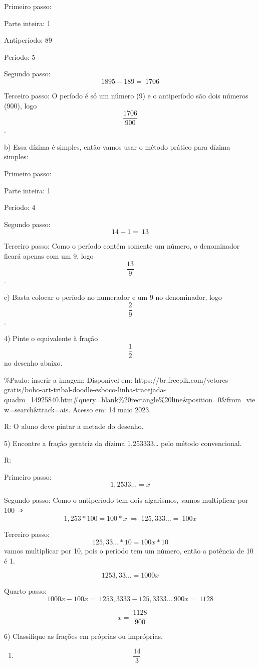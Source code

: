 Primeiro passo:

Parte inteira: 1

Antiperíodo: 89

Período: 5

Segundo passo: \[1895 - 189 = \ 1706\]

Terceiro passo: O período é só um número (9) e o antiperíodo são dois
números (900), logo \[\frac{1706}{900}\].

b) Essa dízima é simples, então vamos usar o método prático para dízima
simples:

Primeiro passo:

Parte inteira: 1

Período: 4

Segundo passo: \[14 - 1 = \ 13\]

Terceiro passo: Como o período contém somente um número, o denominador
ficará apenas com um 9, logo \[\frac{13}{9}\].

c) Basta colocar o período no numerador e um 9 no denominador, logo
\[\frac{2}{9}\].

4) Pinte o equivalente à fração \[\frac{1}{2}\] no desenho abaixo.

\%Paulo: inserir a imagem: Disponível em:
https://br.freepik.com/vetores-gratis/boho-art-tribal-doodle-esboco-linha-tracejada-quadro\_14925840.htm\#query=blank\%20rectangle\%20line\&position=0\&from\_view=search\&track=ais.
Acesso em: 14 maio 2023.

R: O aluno deve pintar a metade do desenho.

5) Encontre a fração geratriz da dízima 1,253333\ldots{} pelo método
convencional.

R:

Primeiro passo: \[1,2533\ldots = x\]

Segundo passo: Como o antiperíodo tem dois algarismos, vamos multiplicar
por 100 ⇒ \[1,253*100 = 100*x\  \Rightarrow \ 125,333\ldots = \ 100x\]

Terceiro passo: \[125,33\ldots*10 = 100x*10\] vamos multiplicar por 10,
pois o período tem um número, então a potência de 10 é 1.

\[1253,33\ldots = 1000x\]

Quarto passo:
\[1000x - 100x = \ 1253,3333 - 125,3333\ldots\ 900x = \ 1128\]

\[\text{ }x = \ \frac{1128}{900}\]

6) Classifique as frações em próprias ou impróprias.

\begin{enumerate}
\def\labelenumi{\alph{enumi})}
\tightlist
\item
  \[\ \frac{14}{3}\]
\end{enumerate}

